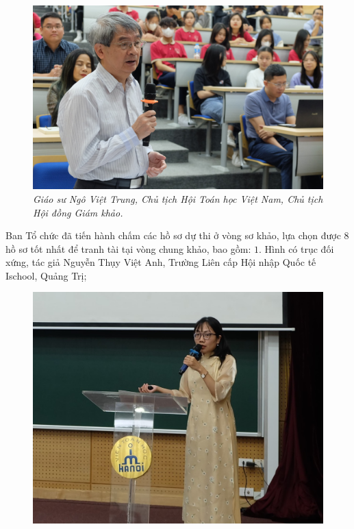 \begin{multicols}{2}
\begin{figure}[H]
		\includegraphics[width= 1\linewidth]{1}
		\caption{\small\textit{\color{doisongtoanhoc}Giáo sư Ngô Việt Trung, Chủ tịch Hội Toán học Việt Nam, Chủ tịch Hội đồng Giám khảo.}}
		\vspace*{-10pt}
	\end{figure}
	Ban Tổ chức đã tiến hành chấm các hồ sơ dự thi ở vòng sơ khảo, lựa chọn được $8$ hồ sơ tốt nhất để tranh tài tại vòng chung khảo, bao gồm: 
	\vskip 0.1cm
	$1$. Hình có trục đối xứng, tác giả Nguyễn Thụy Việt Anh, Trường Liên cấp Hội nhập Quốc tế Ischool, Quảng Trị; 
	\begin{figure}[H]
		\vspace*{-5pt}
		\centering
		\captionsetup{labelformat= empty, justification=centering}
		\includegraphics[width= 1\linewidth]{2}

\end{figure}
\end{multicols}
